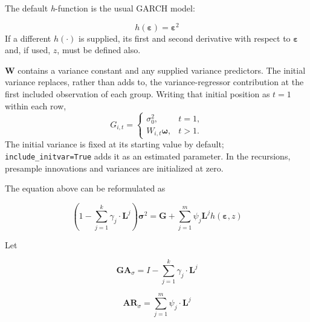 \documentclass[12pt]{article}
\begin{document}
The default \emph{h}-function is the usual GARCH model:

\begin{equation}
h( \mathbf{\varepsilon} ) = \mathbf{\varepsilon}^{2} 
\label{eq:20}
\end{equation}
If a different $h( \cdot )$ is supplied, its first and second derivative with respect to $\mathbf{\varepsilon}$ and, if used, $z$, must be defined also.

$\mathbf{W}$ contains a variance constant and any supplied variance predictors. The initial variance replaces, rather than adds to, the variance-regressor contribution at the first included observation of each group. Writing that initial position as $t=1$ within each row,
\begin{equation}
G_{i,t}=\begin{cases}
\sigma_{0}^{2}, & t=1,\\
W_{i,t}\boldsymbol{\omega}, & t>1.
\end{cases}
\label{eq:24b}
\end{equation}
The initial variance is fixed at its starting value by default; \texttt{include\_}\allowbreak\texttt{initvar=True} adds it as an estimated parameter. In the recursions, presample innovations and variances are initialized at zero.

The equation above can be reformulated as


\begin{equation}
\left( 1 - \sum_{j = 1}^{k}{\gamma_{j} \cdot}\mathbf{L}^{j} \right)\mathbf{\sigma}^{2} = \mathbf{G} + \sum_{j = 1}^{m}{\psi_{j}\mathbf{\mathbf{L}}^{j}h\left( \mathbf{\varepsilon},z \right)}
\label{eq:21}
\end{equation}

Let

\begin{equation}
\mathbf{GA}_{\sigma} =  I - \sum_{j = 1}^{k}{\gamma_{j} \cdot \mathbf{L}^{j}}
\label{eq:22}
\end{equation}

\begin{equation}
\mathbf{AR}_{\sigma} = \sum_{j = 1}^{m}{\psi_{j} \cdot \mathbf{L}^{j}}
\label{eq:23}
\end{equation}
\end{document}
